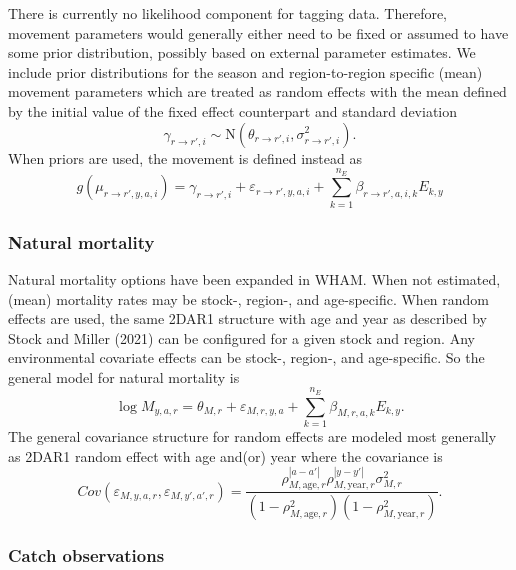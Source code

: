 \documentclass[
]{article}
\begin{document}
There is currently no likelihood component for tagging data. Therefore,
movement parameters would generally either need to be fixed or assumed
to have some prior distribution, possibly based on external parameter
estimates. We include prior distributions for the season and
region-to-region specific (mean) movement parameters which are treated
as random effects with the mean defined by the initial value of the
fixed effect counterpart and standard deviation \begin{equation*}
  \gamma_{r\rightarrow r',i} \sim \text{N}\left(\theta_{r\rightarrow r',i}, \sigma^2_{r\rightarrow r',i}\right).
  \end{equation*} When priors are used, the movement is defined instead
as \begin{equation*}
  g(\mu_{r\rightarrow r',y,a,i}) = \gamma_{r\rightarrow r',i} + \varepsilon_{r\rightarrow r',y,a,i} + \sum^{n_E}_{k=1} \beta_{r\rightarrow r',a,i,k} E_{k,y} 
  \end{equation*}

\hypertarget{natural-mortality}{%
\subsubsection*{Natural mortality}\label{natural-mortality}}

Natural mortality options have been expanded in WHAM. When not
estimated, (mean) mortality rates may be stock-, region-, and
age-specific. When random effects are used, the same 2DAR1 structure
with age and year as described by Stock and Miller (2021) can be
configured for a given stock and region. Any environmental covariate
effects can be stock-, region-, and age-specific. So the general model
for natural mortality is \begin{equation*}
  \log M_{y,a,r} = \theta_{M,r} + \varepsilon_{M,r,y,a} + \sum^{n_E}_{k=1} \beta_{M,r,a,k} E_{k,y}.
\end{equation*} The general covariance structure for random effects are
modeled most generally as 2DAR1 random effect with age and(or) year
where the covariance is \begin{equation*}
  Cov\left(\varepsilon_{M,y,a,r},\varepsilon_{M,y',a',r}\right) =   \frac{\rho_{M,\text{age},r}^{|a-a'|}\rho_{M,\text{year},r}^{|y-y'|}\sigma^2_{M,r}}{\left(1 -  \rho_{M,\text{age},r}^2\right)\left(1 - \rho_{M,\text{year},r}^2\right)}.
\end{equation*}

\hypertarget{catch-observations}{%
\subsubsection*{Catch observations}\label{catch-observations}}
\end{document}
